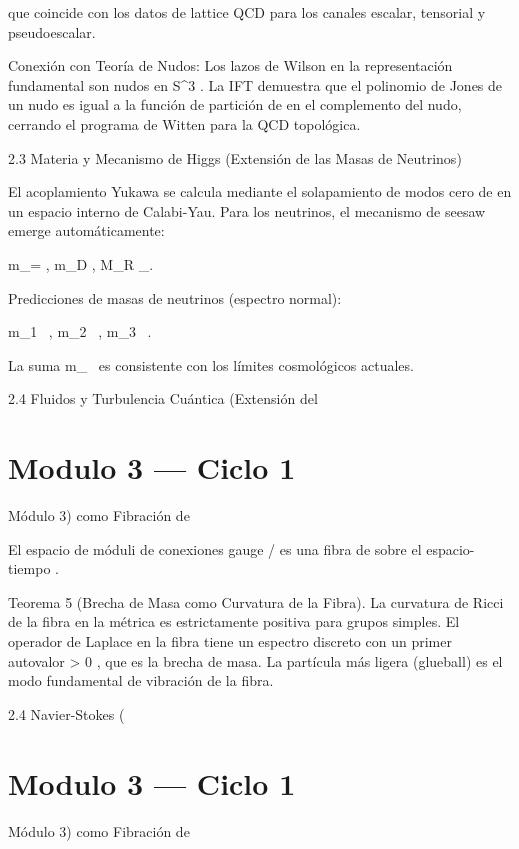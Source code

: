 \documentclass[12pt,twoside]{book}
\begin{document}
que coincide con los datos de lattice QCD para los canales escalar, tensorial y pseudoescalar.

Conexión con Teoría de Nudos: Los lazos de Wilson en la representación fundamental son nudos en  S^3 . La IFT demuestra que el polinomio de Jones de un nudo es igual a la función de partición de  \rho  en el complemento del nudo, cerrando el programa de Witten para la QCD topológica.

2.3 Materia y Mecanismo de Higgs (Extensión de las Masas de Neutrinos)

El acoplamiento Yukawa se calcula mediante el solapamiento de modos cero de  \rho  en un espacio interno de Calabi-Yau. Para los neutrinos, el mecanismo de seesaw emerge automáticamente:

m_\nu = , \quad m_D \propto \langle \rho \rangle, \quad M_R \propto \Lambda_{}.

Predicciones de masas de neutrinos (espectro normal):

m_1 \ , \quad m_2 \ , \quad m_3 \ .

La suma  \sum m_\nu {}\   es consistente con los límites cosmológicos actuales.

2.4 Fluidos y Turbulencia Cuántica (Extensión del 

\chapter{Modulo 3 — Ciclo 1}
Módulo 3) como Fibración de   

El espacio de móduli de conexiones gauge  /  es una fibra de    sobre el espacio-tiempo   .

Teorema 5 (Brecha de Masa como Curvatura de la Fibra). La curvatura de Ricci de la fibra en la métrica    es estrictamente positiva para grupos simples. El operador de Laplace en la fibra tiene un espectro discreto con un primer autovalor  \Delta > 0 , que es la brecha de masa. La partícula más ligera (glueball) es el modo fundamental de vibración de la fibra.

2.4 Navier-Stokes (

\chapter{Modulo 3 — Ciclo 1}
Módulo 3) como Fibración de   
\end{document}
